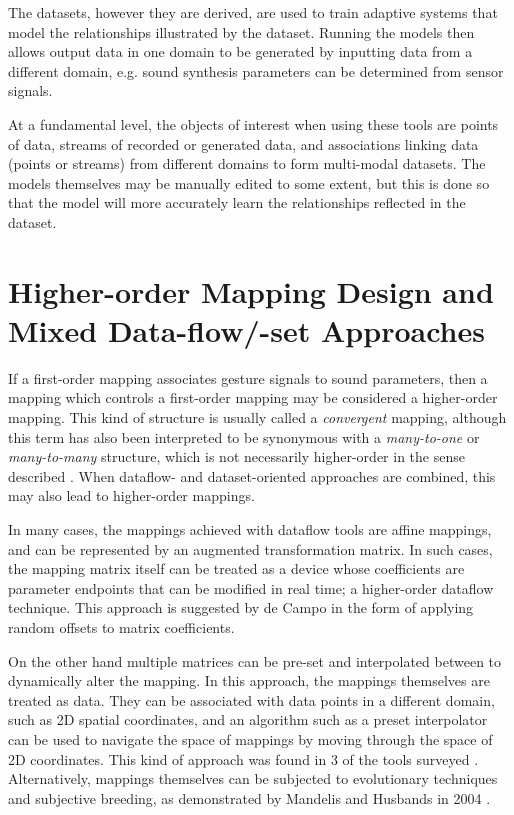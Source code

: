\documentclass[main.tex]{subfiles}
\begin{document}
The datasets, however they are derived, are used to train adaptive systems that
model the relationships illustrated by the dataset.  Running the models then
allows output data in one domain to be generated by inputting data from a
different domain, e.g. sound synthesis parameters can be determined from sensor
signals.

At a fundamental level, the objects of interest when using these tools are
points of data, streams of recorded or generated data, and associations linking
data (points or streams) from different domains to form multi-modal datasets.
The models themselves may be manually edited to some extent, but this is done
so that the model will more accurately learn the relationships reflected in the
dataset.

\section{Higher-order Mapping Design and Mixed Data-flow/-set Approaches}

If a first-order mapping associates gesture signals to sound parameters, then a
mapping which controls a first-order mapping may be considered a higher-order
mapping. This kind of structure is usually called a \emph{convergent} mapping,
although this term has also been interpreted to be synonymous with a
\emph{many-to-one} or \emph{many-to-many} structure, which is not necessarily
higher-order in the sense described \cite{West2020thesis}. When dataflow- and
dataset-oriented approaches are combined, this may also lead to higher-order
mappings.

In many cases, the mappings achieved with dataflow tools are affine mappings,
and can be represented by an augmented transformation matrix.  In such cases,
the mapping matrix itself can be treated as a device whose coefficients are
parameter endpoints that can be modified in real time; a higher-order dataflow
technique.  This approach is suggested by de Campo \cite{decampo2014icmc_metacontrol}
in the form of applying random offsets to matrix coefficients.

On the other hand multiple matrices can be pre-set and interpolated between to
dynamically alter the mapping.  In this approach, the mappings themselves are
treated as data.  They can be associated with data points in a different
domain, such as 2D spatial coordinates, and an algorithm such as a preset
interpolator can be used to navigate the space of mappings by moving through
the space of 2D coordinates.  This kind of approach was found in 3 of the tools
surveyed \cite{bevilacqua2005nime_mnm, Brandtsegg2011, decampo2014icmc_metacontrol}.  Alternatively,
mappings themselves can be subjected to evolutionary techniques and subjective
breeding, as demonstrated by Mandelis and Husbands in 2004
\cite{mandelis2004grow-it}.
\end{document}
